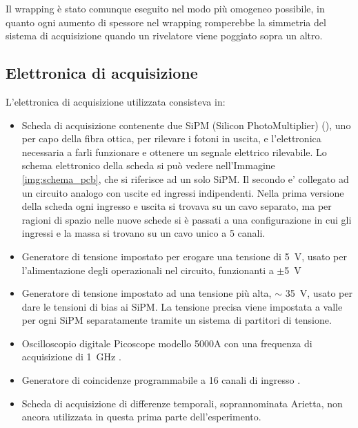 Il wrapping è stato comunque eseguito nel modo più omogeneo possibile, in quanto ogni aumento di spessore nel wrapping romperebbe la simmetria del sistema di acquisizione quando un rivelatore viene poggiato sopra un altro.

\subsection{Elettronica di acquisizione}

L'elettronica di acquisizione utilizzata consisteva in:
\begin{itemize}
\item Scheda di acquisizione contenente due SiPM (Silicon PhotoMultiplier) (\cite{bib:SiPM}), uno per capo della fibra ottica, per rilevare i fotoni in uscita, e l'elettronica necessaria a farli funzionare e ottenere un segnale elettrico rilevabile. Lo schema elettronico della scheda si pu\`o vedere nell'Immagine \ref{img:schema_pcb}, che si riferisce ad un solo SiPM. Il secondo e' collegato ad un circuito analogo con uscite ed ingressi indipendenti. Nella prima versione della scheda ogni ingresso e uscita si trovava su un cavo separato, ma per ragioni di spazio nelle nuove schede si \`e passati a una configurazione in cui gli ingressi e la massa si trovano su un cavo unico a 5 canali.


\item Generatore di tensione impostato per erogare una tensione di 5~V, usato per l'alimentazione degli operazionali nel circuito, funzionanti a $\pm$5~V

\item Generatore di tensione impostato ad una tensione pi\`u alta, $\sim$ 35~V, usato per dare le tensioni di bias ai SiPM. La tensione precisa viene impostata a valle per ogni SiPM separatamente tramite un sistema di partitori di tensione.

\item Oscilloscopio digitale Picoscope modello 5000A con una frequenza di acquisizione di 1~GHz \cite{bib:datasheet_pico}.

\item Generatore di coincidenze programmabile a 16 canali di ingresso \cite{bib:articolo_garfa}.

\item Scheda di acquisizione di differenze temporali, soprannominata Arietta, non ancora utilizzata in questa prima parte dell'esperimento.

\end{itemize}

